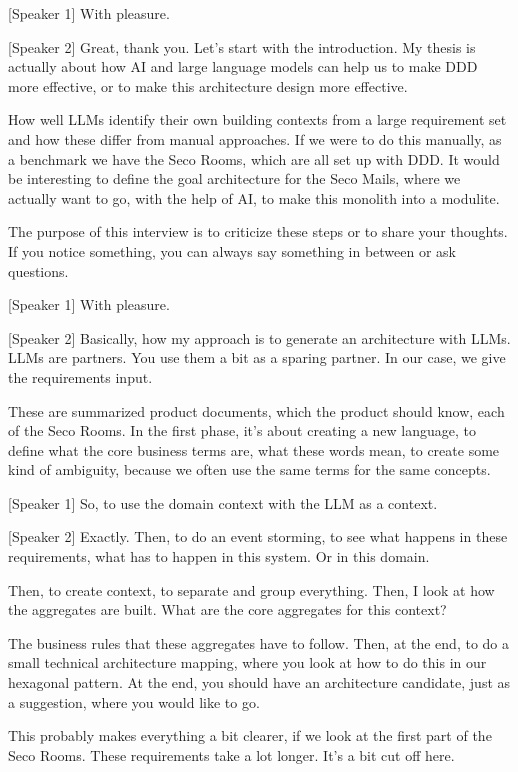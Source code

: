 [Speaker 1]
With pleasure.

[Speaker 2]
Great, thank you. Let's start with the introduction. My thesis is actually about how AI and large language models can help us to make DDD more effective, or to make this architecture design more effective.

How well LLMs identify their own building contexts from a large requirement set and how these differ from manual approaches. If we were to do this manually, as a benchmark we have the Seco Rooms, which are all set up with DDD. It would be interesting to define the goal architecture for the Seco Mails, where we actually want to go, with the help of AI, to make this monolith into a modulite.

The purpose of this interview is to criticize these steps or to share your thoughts. If you notice something, you can always say something in between or ask questions.

[Speaker 1]
With pleasure.

[Speaker 2]
Basically, how my approach is to generate an architecture with LLMs. LLMs are partners. You use them a bit as a sparing partner. In our case, we give the requirements input.

These are summarized product documents, which the product should know, each of the Seco Rooms. In the first phase, it's about creating a new language, to define what the core business terms are, what these words mean, to create some kind of ambiguity, because we often use the same terms for the same concepts.

[Speaker 1]
So, to use the domain context with the LLM as a context.

[Speaker 2]
Exactly. Then, to do an event storming, to see what happens in these requirements, what has to happen in this system. Or in this domain.

Then, to create context, to separate and group everything. Then, I look at how the aggregates are built. What are the core aggregates for this context?

The business rules that these aggregates have to follow. Then, at the end, to do a small technical architecture mapping, where you look at how to do this in our hexagonal pattern. At the end, you should have an architecture candidate, just as a suggestion, where you would like to go.

This probably makes everything a bit clearer, if we look at the first part of the Seco Rooms. These requirements take a lot longer. It's a bit cut off here.

